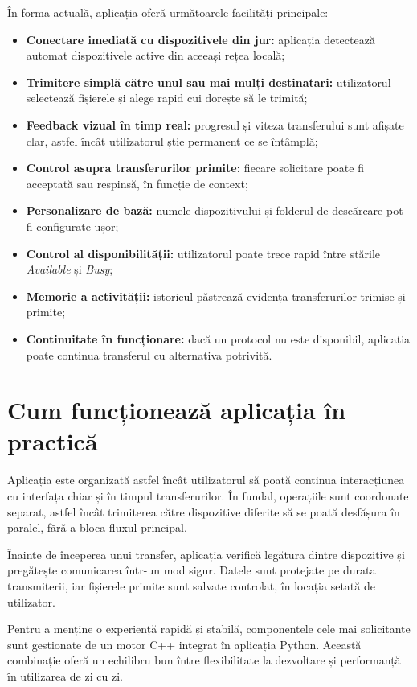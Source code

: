 \documentclass[12pt,a4paper]{report}
\begin{document}
În forma actuală, aplicația oferă următoarele facilități principale:
\begin{itemize}
    \item \textbf{Conectare imediată cu dispozitivele din jur:} aplicația detectează automat dispozitivele active din aceeași rețea locală;
    \item \textbf{Trimitere simplă către unul sau mai mulți destinatari:} utilizatorul selectează fișierele și alege rapid cui dorește să le trimită;
    \item \textbf{Feedback vizual în timp real:} progresul și viteza transferului sunt afișate clar, astfel încât utilizatorul știe permanent ce se întâmplă;
    \item \textbf{Control asupra transferurilor primite:} fiecare solicitare poate fi acceptată sau respinsă, în funcție de context;
    \item \textbf{Personalizare de bază:} numele dispozitivului și folderul de descărcare pot fi configurate ușor;
    \item \textbf{Control al disponibilității:} utilizatorul poate trece rapid între stările \textit{Available} și \textit{Busy};
    \item \textbf{Memorie a activității:} istoricul păstrează evidența transferurilor trimise și primite;
    \item \textbf{Continuitate în funcționare:} dacă un protocol nu este disponibil, aplicația poate continua transferul cu alternativa potrivită.
\end{itemize}

\section*{Cum funcționează aplicația în practică}

Aplicația este organizată astfel încât utilizatorul să poată continua interacțiunea cu interfața chiar și în timpul transferurilor. În fundal, operațiile sunt coordonate separat, astfel încât trimiterea către dispozitive diferite să se poată desfășura în paralel, fără a bloca fluxul principal.

Înainte de începerea unui transfer, aplicația verifică legătura dintre dispozitive și pregătește comunicarea într-un mod sigur. Datele sunt protejate pe durata transmiterii, iar fișierele primite sunt salvate controlat, în locația setată de utilizator.

Pentru a menține o experiență rapidă și stabilă, componentele cele mai solicitante sunt gestionate de un motor C++ integrat în aplicația Python. Această combinație oferă un echilibru bun între flexibilitate la dezvoltare și performanță în utilizarea de zi cu zi.
\end{document}

